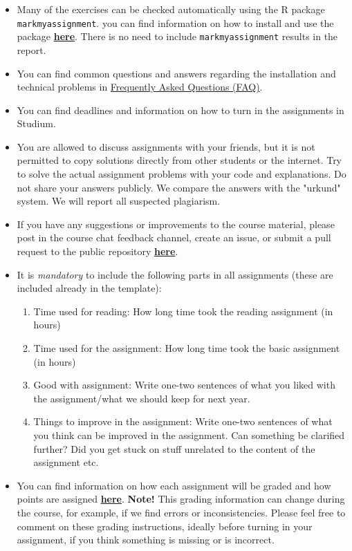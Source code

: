 \begin{itemize}
\begin{enumerate}
\end{enumerate}
\item Many of the exercises can be checked automatically using the R package \\ \texttt{markmyassignment}. you can find information on how to install and use the package \href{https://cran.r-project.org/web/packages/markmyassignment/vignettes/markmyassignment.html}{\textbf{here}}. There is no need to include \texttt{markmyassignment} results in the report.
\item You can find common questions and answers regarding the installation and technical problems in \href{https://github.com/MansMeg/BSDA/blob/main/FAQ.md}{Frequently Asked Questions (FAQ)}.
\item You can find deadlines and information on how to turn in the assignments in Studium.
\item You are allowed to discuss assignments with your friends, but it is not permitted to copy solutions directly from other students or the internet. Try to solve the actual assignment problems with your code and explanations. Do not share your answers publicly. We compare the answers with the "urkund" system. We will report all suspected plagiarism.
\item If you have any suggestions or improvements to the course material, please post in the course chat feedback channel, create an issue, or submit a pull request to the public repository \href{https://github.com/MansMeg/BSDA/issues}{\textbf{here}}.
\item It is \emph{mandatory} to include the following parts in all assignments (these are included already in the template):
\begin{enumerate}
\item Time used for reading: How long time took the reading assignment (in hours)
\item Time used for the assignment: How long time took the basic assignment (in hours)
\item Good with assignment: Write one-two sentences of what you liked with the assignment/what we should keep for next year.
\item Things to improve in the assignment: Write one-two sentences of what you think can be improved in the assignment. Can something be clarified further? Did you get stuck on stuff unrelated to the content of the assignment etc.
\end{enumerate}
\item You can find information on how each assignment will be graded and how points are assigned \href{https://github.com/MansMeg/BSDA/tree/main/grading}{\textbf{here}}. \textbf{Note!} This grading information can change during the course, for example, if we find errors or inconsistencies. Please feel free to comment on these grading instructions, ideally before turning in your assignment, if you think something is missing or is incorrect.

\end{itemize}
